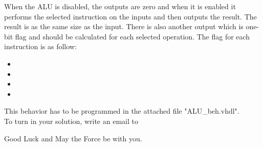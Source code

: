 \documentclass[a4paper,12pt]{article}
\begin{document}
When the ALU is disabled, the outputs are zero and when it is enabled it performs the selected instruction on the inputs and then outputs the result. The result is as the same size as the input. There is also another output which is one-bit flag and should be calculated for each selected operation. The flag for each instruction is as follow:
\begin{itemize}
\item %
\item %
\item %
\item %
\end{itemize}
\vspace{0.3cm}

This behavior has to be programmed in the attached file "ALU\_beh.vhdl". 
\\

To turn in your solution, write an email to %

\vspace{0.7cm}

Good Luck and May the Force be with you.
\end{document}
